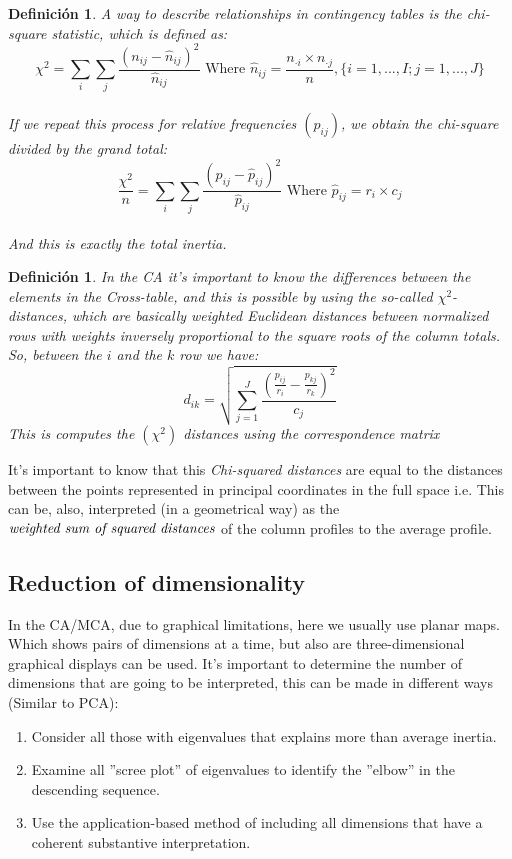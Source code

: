 \documentclass[12pt]{extarticle}
\newtheorem{definition}[theorem]{Definici\'{o}n}
\numberwithin{equation}{section}
\newcommand{\Dsum}{\displaystyle\sum}
\begin{document}
\begin{definition}
A way to describe relationships in contingency tables is the chi-square statistic, which is defined as: 
 $$ \chi^2 = \sum_i \sum_j \dfrac{(n_{ij} - \hat{n}_{ij})^2}{\hat{n}_{ij}} \text{ Where } \hat{n}_{ij} =  \frac{n_{\cdot i} \times n_{\cdot j}}{n}, \{i = 1,...,I; j= 1,...,J\}$$
\\
If we repeat this process for relative frequencies $(p_{ij})$, we obtain the chi-square divided by the grand total: 
$$ \frac{\chi^2}{n} = \sum_i \sum_j \dfrac{(p_{ij} - \hat{p}_{ij})^2}{\hat{p}_{ij}} \text{ Where } \hat{p}_{ij} = r_i \times c_j$$
\\
And this is exactly the total inertia. \\
\end{definition}
\begin{definition}
In the CA it's important to know the differences between the elements in the Cross-table, and this is possible by using the so-called $\chi^2$-distances, which are basically weighted Euclidean distances between normalized rows with weights inversely proportional to the square roots of the column totals. So, between the $i$ and the $k$ row we have:
$$ d_{ik} = \sqrt{\Dsum_{j=1}^J\frac{(\frac{p_{ij}}{r_i} - \frac{p_{kj}}{r_k})^2}{c_j}}$$
This is computes the $(\chi^2 )$ distances using the correspondence matrix %
\end{definition}

It's important to know that this \emph{Chi-squared distances} are equal to the distances between the points represented in principal coordinates in the full space i.e. 
This can be, also, interpreted (in a geometrical way) as the $\emph{weighted sum of squared distances}$ of the column profiles to the average profile. 
\subsection{Reduction of dimensionality}
In the CA/MCA, due to graphical limitations, here we usually use planar maps. Which shows pairs of dimensions at a time, but also are three-dimensional graphical displays can be used. 
It's important to determine the number of dimensions that are going to be interpreted, this can be made in different ways (Similar to PCA): \begin{enumerate}
\item  Consider all those with eigenvalues that explains more  than average inertia.
\item  Examine all ''scree plot'' of eigenvalues to identify the ''elbow'' in the descending sequence.
\item Use the application-based method of including all dimensions that have a coherent substantive interpretation.
\end{enumerate}
\end{document}

